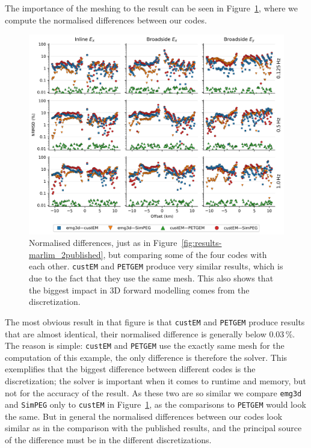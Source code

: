 \documentclass[extra, camera,%
]{gji}
\newcommand{\emg}[2]{\texttt{emg#1#2}\xspace}
\newcommand{\simpeg}{\texttt{SimPEG}\xspace}
\newcommand{\custem}{\texttt{custEM}\xspace}
\newcommand{\petgem}{\texttt{PETGEM}\xspace}
\begin{document}
The importance of the meshing to the result can be seen in Figure~\ref{fig:results-marlim_2ours}, where we compute the normalised differences between our codes.
%
\begin{figure}
  \centering
  \includegraphics[width=.9\linewidth]{figures/results-marlim_2ours.png}
  \caption{Normalised differences, just as in Figure~\ref{fig:results-marlim_2published}, but comparing some of the four codes with each other. \custem and \petgem produce very similar results, which is due to the fact that they use the same mesh. This also shows that the biggest impact in 3D forward modelling comes from the discretization.}
  \label{fig:results-marlim_2ours}
\end{figure}
%
The most obvious result in that figure is that \custem and \petgem produce results that are almost identical, their normalised difference is generally below 0.03\,\%.  The reason is simple: \custem and \petgem use the exactly same mesh for the computation of this example, the only difference is therefore the solver. This exemplifies that the biggest difference between different codes is the discretization; the solver is important when it comes to runtime and memory, but not for the accuracy of the result. As these two are so similar we compare \emg3d and \simpeg only to \custem in Figure~\ref{fig:results-marlim_2ours}, as the comparisons to \petgem would look the same. But in general the normalised differences between our codes look similar as in the comparison with the published results, and the principal source of the difference must be in the different discretizations.
\end{document}
